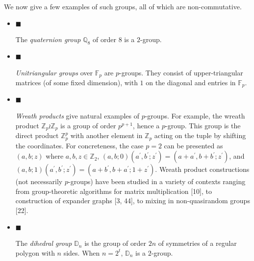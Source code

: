 We now give a few examples of such groups, all of which are non-commutative.\par


\begin{itemize}


\item[] 
$\blacksquare$ 


The \emph{quaternion group $\mathbb{Q}_{8}$ }of order $8$ is a $2$-group.\par





\item[] 
$\blacksquare$ 


\emph{Unitriangular groups} over $\mathbb{F}_{p}$ are $p$-groups.
They consist of upper-triangular matrices (of some fixed dimension),
with $1$ on the diagonal and entries in $\mathbb{F}_{p}$.\par





\item[] 
$\blacksquare$ 


\emph{Wreath products} give natural examples of $p$-groups. For example,
the wreath product $\mathbb{Z}_{p}\wr\mathbb{Z}_{p}$ is a group of
order $p^{p+1}$, hence a $p$-group. This group is the direct product
$\mathbb{Z}_{p}^{p}$ with another element in $\mathbb{Z}_{p}$ acting
on the tuple by shifting the coordinates. For concreteness, the case
$p=2$ can be presented as $(a,b;z)$ where $a,b,z\in\mathbb{Z}_{2}$,
$(a,b;0)(a^{\prime},b^{\prime};z^{\prime})=(a+a^{\prime},b+b^{\prime};z^{\prime})$, and $(a,b;1)(a^{\prime},b^{\prime};z^{\prime})=(a+b^{\prime},b+a^{\prime};1+z^{\prime})$.
Wreath product constructions (not necessarily $p$-groups) have been
studied in a variety of contexts ranging from group-theoretic algorithms
for matrix multiplication [10], to construction of expander
graphs [3, 44], to mixing
in non-quasirandom groups [22].\par





\item[] 
$\blacksquare$ 


The \emph{dihedral group }$\mathbb{D}_{n}$ is the group of order $2n$ of symmetries
of a regular polygon with $n$ sides. When $n=2^{t}$, $\mathbb{D}_{n}$ is a $2$-group.\par





\end{itemize}




